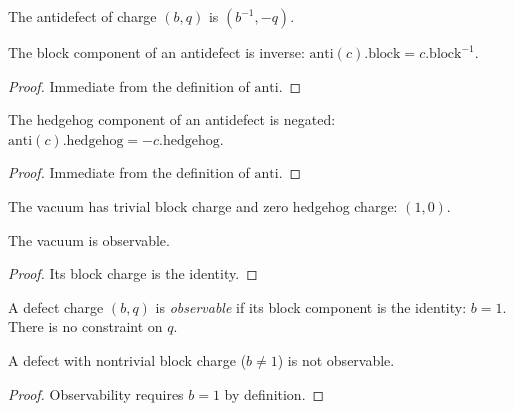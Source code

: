 \begin{definition}
The antidefect of charge $(b, q)$ is $(b^{-1}, -q)$.
\end{definition}

\begin{theorem}
The block component of an antidefect is inverse: $\mathrm{anti}(c).\mathrm{block} = c.\mathrm{block}^{-1}$.
\end{theorem}

\begin{proof}
Immediate from the definition of $\mathrm{anti}$.
\end{proof}

\begin{theorem}
The hedgehog component of an antidefect is negated: $\mathrm{anti}(c).\mathrm{hedgehog} = -c.\mathrm{hedgehog}$.
\end{theorem}

\begin{proof}
Immediate from the definition of $\mathrm{anti}$.
\end{proof}

\begin{definition}
The vacuum has trivial block charge and zero hedgehog charge: $(1, 0)$.
\end{definition}

\begin{theorem}
The vacuum is observable.
\end{theorem}

\begin{proof}
Its block charge is the identity.
\end{proof}

\begin{definition}
A defect charge $(b, q)$ is \emph{observable} if its block component is the identity: $b = 1$. There is no constraint on $q$.
\end{definition}

\begin{theorem}
A defect with nontrivial block charge ($b \neq 1$) is not observable.
\end{theorem}

\begin{proof}
Observability requires $b = 1$ by definition.
\end{proof}

